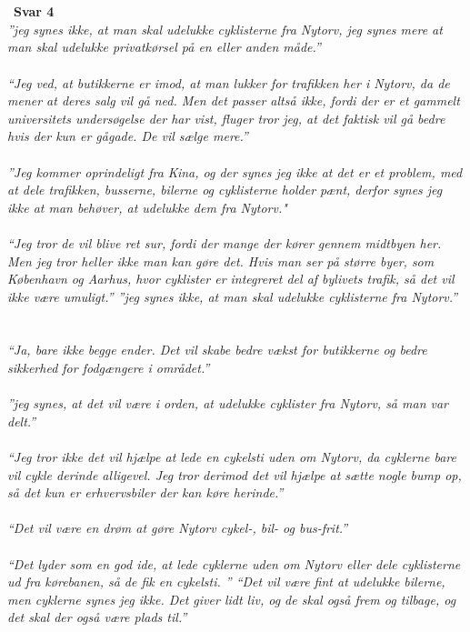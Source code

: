 ~\\\\
~\textbf{Svar 4} ~\\
\emph{”jeg synes ikke, at man skal udelukke cyklisterne fra Nytorv, jeg synes mere at man skal udelukke privatkørsel på en eller anden måde.”}
~\\\\
  \emph{“Jeg ved, at butikkerne er imod, at man lukker for trafikken her i Nytorv, da de mener at deres salg vil gå ned. Men det passer altså ikke, fordi der er et gammelt universitets undersøgelse der har vist, fluger tror jeg, at det faktisk vil gå bedre hvis der kun er gågade. De vil sælge mere.”}
~\\\\
\emph{”Jeg kommer oprindeligt fra Kina, og der synes jeg ikke at det er et problem, med at dele trafikken, busserne, bilerne og cyklisterne holder pænt, derfor synes jeg ikke at man behøver, at udelukke dem fra Nytorv."}
~\\\\
\emph{ “Jeg tror de vil blive ret sur, fordi der mange der kører gennem midtbyen her. Men jeg tror heller ikke man kan gøre det. Hvis man ser på større byer, som København og Aarhus, hvor cyklister er integreret del af bylivets trafik, så det vil ikke være umuligt.”
  ”jeg synes ikke, at man skal udelukke cyklisterne fra Nytorv.”}
~\\\\

  \emph{“Ja, bare ikke begge ender. Det vil skabe bedre vækst for butikkerne og bedre sikkerhed for fodgængere i området.”}
~\\\\
  \emph{”jeg synes, at det vil være i orden, at udelukke cyklister fra Nytorv, så man var delt.”}
~\\\\
  \emph{“Jeg tror ikke det vil hjælpe at lede en cykelsti uden om Nytorv, da cyklerne bare vil cykle derinde alligevel. Jeg tror derimod det vil hjælpe at sætte nogle bump op, så det kun er erhvervsbiler der kan køre herinde.”}
~\\\\
  \emph{“Det vil være en drøm at gøre Nytorv cykel-, bil- og bus-frit.”}
~\\\\
  \emph{“Det lyder som en god ide, at lede cyklerne uden om Nytorv eller dele cyklisterne ud fra kørebanen, så de fik en cykelsti. ”
  “Det vil være fint at udelukke bilerne, men cyklerne synes jeg ikke. Det giver lidt liv, og de skal også frem og tilbage, og det skal der også være plads til.”}
~\\\\

